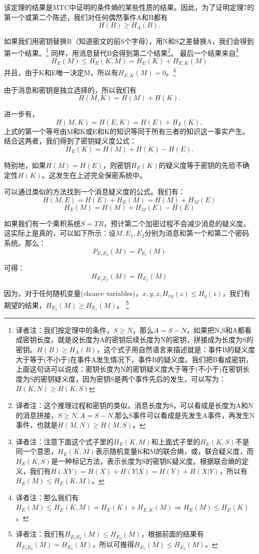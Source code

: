 \documentclass[]{article}
\begin{document}
该定理的结果是MTC中证明的条件熵的某些性质的结果。因此，为了证明定理7的第一个或第二个陈述，我们对任何偶然事件A和B都有
\[H(B)\geq H_A(B).\]

如果我们用密钥替换B（知道密文的前S个字母），用N和S之差替换A，我们会得到第一个结果。\footnote{译者注：我们按定理中的条件，$S\geq N$，那么$A=S-N$，如果把N,S和A都看成密钥长度，就是说长度为A的密钥后续长度为N的密钥，拼接成为长度为S的密钥。$H(B)\geq H_A(B)$，这个式子用自然语言来描述就是：事件B的疑义度大于等于(不小于)在事件A发生情况下，事件B的疑义度。我们把B看成密钥，上面这句话可以说成：密钥长度为N的密钥疑义度大于等于(不小于)在密钥长度为S的密钥疑义度，因为密钥S是两个事件先后的发生，可以写为：$H(K,N)\geq H(K,S)$}
同样，用消息替代B会得到第二个结果\footnote{译者注：这个推理过程和密钥的类似，消息长度为S，可以看成是长度为A和N的消息拼接，$S\geq N,A=S-N$,那么S事件可以看成是先发生A事件，再发生N事件，也就是$H(M,N)\geq H(M,S)$。}。
最后一个结果来自\footnote{译者注：注意下面这个式子里的$H_{E}(K,M)$和上面式子里的$H_{E}(K,S)$不是同一个意思，$H_{E}(K,M)$表示随机变量K和M的联合熵，或，联合疑义度，而$H_{E}(K,S)$是一种标记方法，表示长度为S的密钥K疑义度。根据联合熵的定义，我们有$H(XY)=H(X)+H(Y|X)=H(Y)+H(X|Y)$，所以有$H_E(M) \leq H_E(K,M) $。}
\[H_E(M) \leq H_E(K,M) = H_E(K) + H_{E,K}(M)\]
并且，由于K和E唯一决定M，所以有$H_{E,K}(M)=0$。\footnote{译者注：那么我们有$H_E(M) \leq H_E(K,M) = H_E(K) + H_{E,K}(M)\Rightarrow H_E(M) \leq H_E(K)$。}

由于消息和密钥是独立选择的，所以我们有
\[H(M,K)=H(M)+H(K).\]

进一步有，
\[H(M,K)=H(E,K)=H(E)+H_E(K),\]
上式的第一个等号由M和K或E和K的知识等同于所有三者的知识这一事实产生。结合这两者，我们得到了密钥疑义度公式：
\[H_E(K)=H(M)+H(K)-H(E).\]

特别地，如果$H(M)=H(E)$，则密钥$H_E(K)$的疑义度等于密钥的先验不确定性$H(K)$。这发生在上述完全保密系统中。

可以通过类似的方法找到一个消息疑义度的公式。我们有：
\[H(M,E)=H(E)+H_E(M)=H(M)+H_M(E)\]
\[H_E(M)=H(M)+H_M(E)-H(E)\]

如果我们有一个乘积系统$S=TR$，预计第二个加密过程不会减少消息的疑义度。这实际上是真的，可以如下所示：设$M,E_1,E_2$分别为消息和第一个和第二个密码系统。那么：
\[P_{E_1 E_2}(M)=P_{E_1}(M)\]

可得：
\[H_{E_1 E_2}(M)=H_{E_1}(M)\]

因为，对于任何随机变量(chance variables)，$x,y,z,H_{xy}(z)\leq H_y(z)$，我们有期望的结果，$H_{E_2}(M) \geq H_{E_1}(M)$。
\footnote{译者注：我们有$H_{E_1E_2}(M)\leq H_{E_2}(M)$，根据前面的结果有$H_{E_1 E_2}(M)=H_{E_1}(M)$，所以可推得$H_{E_1}(M) \leq H_{E_2}(M)$。}
\end{document}
